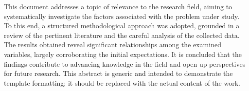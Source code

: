 
This document addresses a topic of relevance to the research field, aiming to systematically investigate the factors associated with the problem under study. To this end, a structured methodological approach was adopted, grounded in a review of the pertinent literature and the careful analysis of the collected data. The results obtained reveal significant relationships among the examined variables, largely corroborating the initial expectations. It is concluded that the findings contribute to advancing knowledge in the field and open up perspectives for future research. This abstract is generic and intended to demonstrate the template formatting; it should be replaced with the actual content of the work.

